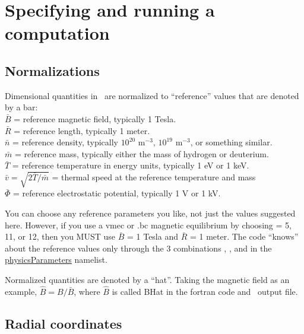\chapter{Specifying and running a computation}

\section{Normalizations}
\label{sec:normalizations}

{\setlength{\parindent}{0cm}
Dimensional quantities in \sfincs~are normalized to ``reference'' values that are denoted by a bar:\\
$\bar{B}$ = reference magnetic field, typically 1 Tesla.\\
$\bar{R}$ = reference length, typically 1 meter.\\
$\bar{n}$ = reference density, typically $10^{20}$ m$^{-3}$, $10^{19}$ m$^{-3}$, or something similar.\\
$\bar{m}$ = reference mass, typically either the mass of hydrogen or deuterium.\\
$\bar{T}$ = reference temperature in energy units, typically 1 eV or 1 keV.\\
$\bar{v} = \sqrt{2 \bar{T} / \bar{m}}$ = thermal speed at the reference temperature and mass\\
$\bar{\Phi}$ = reference electrostatic potential, typically 1 V or 1 kV.\\
}

You can choose any reference parameters you like, not just the values
suggested here. However, if you use a {\ttfamily vmec} or {\ttfamily .bc} magnetic equilibrium
by choosing  = 5, 11, or 12, then you MUST use $\bar{B}$ = 1 Tesla and $\bar{R}$ = 1 meter.
The code ``knows'' about the reference values only through
the 3 combinations , , and 
in the {\ttfamily \hyperref[sec:physicsParameters]{physicsParameters}} namelist.

Normalized quantities are denoted by a ``hat''.  Taking the magnetic field as an example,
$\hat{B}=B/\bar{B}$, where $\hat{B}$ is called {\ttfamily BHat} in the fortran code and \HDF~output file.

\section{Radial coordinates}
\label{sec:radialCoordinates}

